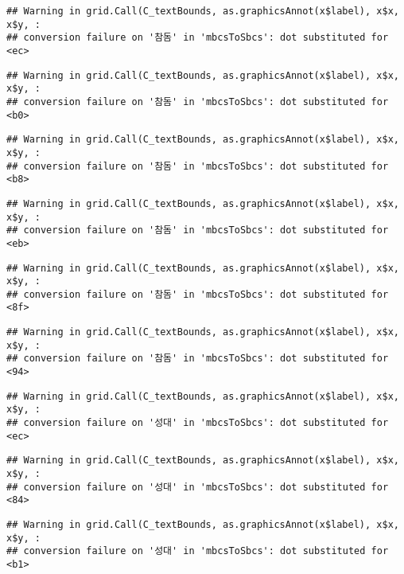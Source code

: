 \documentclass[
]{article}
\begin{document}
\begin{verbatim}
## Warning in grid.Call(C_textBounds, as.graphicsAnnot(x$label), x$x, x$y, :
## conversion failure on '참돔' in 'mbcsToSbcs': dot substituted for <ec>
\end{verbatim}

\begin{verbatim}
## Warning in grid.Call(C_textBounds, as.graphicsAnnot(x$label), x$x, x$y, :
## conversion failure on '참돔' in 'mbcsToSbcs': dot substituted for <b0>
\end{verbatim}

\begin{verbatim}
## Warning in grid.Call(C_textBounds, as.graphicsAnnot(x$label), x$x, x$y, :
## conversion failure on '참돔' in 'mbcsToSbcs': dot substituted for <b8>
\end{verbatim}

\begin{verbatim}
## Warning in grid.Call(C_textBounds, as.graphicsAnnot(x$label), x$x, x$y, :
## conversion failure on '참돔' in 'mbcsToSbcs': dot substituted for <eb>
\end{verbatim}

\begin{verbatim}
## Warning in grid.Call(C_textBounds, as.graphicsAnnot(x$label), x$x, x$y, :
## conversion failure on '참돔' in 'mbcsToSbcs': dot substituted for <8f>
\end{verbatim}

\begin{verbatim}
## Warning in grid.Call(C_textBounds, as.graphicsAnnot(x$label), x$x, x$y, :
## conversion failure on '참돔' in 'mbcsToSbcs': dot substituted for <94>
\end{verbatim}

\begin{verbatim}
## Warning in grid.Call(C_textBounds, as.graphicsAnnot(x$label), x$x, x$y, :
## conversion failure on '성대' in 'mbcsToSbcs': dot substituted for <ec>
\end{verbatim}

\begin{verbatim}
## Warning in grid.Call(C_textBounds, as.graphicsAnnot(x$label), x$x, x$y, :
## conversion failure on '성대' in 'mbcsToSbcs': dot substituted for <84>
\end{verbatim}

\begin{verbatim}
## Warning in grid.Call(C_textBounds, as.graphicsAnnot(x$label), x$x, x$y, :
## conversion failure on '성대' in 'mbcsToSbcs': dot substituted for <b1>
\end{verbatim}
\end{document}
